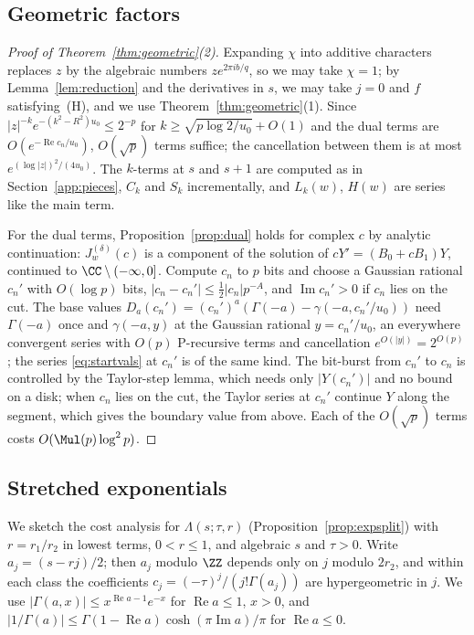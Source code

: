 \begin{small}
\subsection{Geometric factors}\label{app:geometric}
\begin{proof}[Proof of Theorem~\ref{thm:geometric}(2)]
Expanding $\chi$ into additive characters replaces $z$ by the algebraic numbers $ze^{2\pi ib/q}$, so we may take
$\chi = 1$; by Lemma~\ref{lem:reduction} and the derivatives in $s$, we may take $j = 0$ and $f$ satisfying~(H), and
we use Theorem~\ref{thm:geometric}(1). Since $|z|^{-k}e^{-(k^2-R^2)u_0} \le 2^{-p}$ for
$k \ge \sqrt{p\log2/u_0} + O(1)$ and the dual terms are $O(e^{-\operatorname{Re}c_n/u_0})$, $O(\sqrt p)$ terms suffice;
the cancellation between them is at most $e^{(\log|z|)^2/(4u_0)}$. The $k$-terms at $s$ and $s+1$ are computed as in
Section~\ref{app:pieces}, $C_k$ and $S_k$ incrementally, and $L_k(w)$, $H(w)$ are series like the main term.

For the dual terms, Proposition~\ref{prop:dual} holds for complex $c$ by analytic continuation: $J^{(\delta)}_w(c)$ is a
component of the solution of $cY' = (B_0 + cB_1)Y$, continued to $\CC\setminus(-\infty, 0]$. Compute $c_n$ to $p$
bits and choose a Gaussian rational $c_n'$ with $O(\log p)$ bits, $|c_n - c_n'| \le \frac12|c_n|p^{-A}$, and
$\operatorname{Im}c_n' > 0$ if $c_n$ lies on the cut. The base values $D_a(c_n') = (c_n')^a(\Gamma(-a) - \gamma(-a, c_n'/u_0))$
need $\Gamma(-a)$ once and $\gamma(-a, y)$ at the Gaussian rational $y = c_n'/u_0$, an everywhere convergent series with
$O(p)$ P-recursive terms and cancellation $e^{O(|y|)} = 2^{O(p)}$; the series \eqref{eq:startvals} at $c_n'$ is of the
same kind. The bit-burst from $c_n'$ to $c_n$ is controlled by the Taylor-step lemma, which needs only $|Y(c_n')|$
and no bound on a disk; when $c_n$ lies on the cut, the Taylor series at $c_n'$ continue $Y$ along the segment, which
gives the boundary value from above. Each of the $O(\sqrt p)$ terms costs $O(\Mul(p)\log^2p)$.
\end{proof}

\subsection{Stretched exponentials}\label{app:stretched}
We sketch the cost analysis for $\Lambda(s;\tau,r)$ (Proposition~\ref{prop:expsplit}) with $r = r_1/r_2$ in lowest
terms, $0 < r \le 1$, and algebraic $s$ and $\tau > 0$. Write $a_j = (s-rj)/2$; then $a_j$ modulo $\ZZ$ depends only
on $j$ modulo $2r_2$, and within each class the coefficients $c_j = (-\tau)^j/(j!\Gamma(a_j))$ are hypergeometric in
$j$. We use $|\Gamma(a,x)| \le x^{\operatorname{Re}a-1}e^{-x}$ for $\operatorname{Re}a \le 1$, $x > 0$, and
$|1/\Gamma(a)| \le \Gamma(1-\operatorname{Re}a)\cosh(\pi\operatorname{Im}a)/\pi$ for $\operatorname{Re}a \le 0$.


\end{small}
